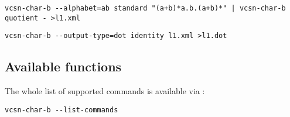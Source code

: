 \documentclass[a4paper]{report}
\begin{document}
\begin{verbatim}
vcsn-char-b --alphabet=ab standard "(a+b)*a.b.(a+b)*" | vcsn-char-b quotient - >l1.xml
\end{verbatim}
\begin{verbatim}
vcsn-char-b --output-type=dot identity l1.xml >l1.dot
\end{verbatim}

\subsection{Available functions}

The whole list of supported commands is available via
:

\begin{verbatim}
vcsn-char-b --list-commands
\end{verbatim}
\end{document}
